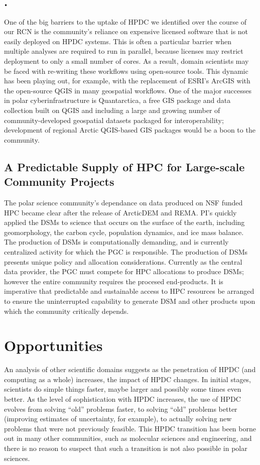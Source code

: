 \texttt{•}\documentclass[10pt,letterpaper,draft]{article}
\begin{document}
One of the big barriers to the uptake of HPDC we identified over the course of our RCN is the community's reliance on expensive licensed software that is not easily deployed on HPDC systems. This is often a particular barrier when multiple analyses are required to run in parallel, because licenses may restrict deployment to only a small number of cores. As a result, domain scientists may be faced with re-writing these workflows using open-source tools. This dynamic has been playing out, for example, with the replacement of ESRI's ArcGIS with the open-source QGIS in many geospatial workflows. One of the major successes in polar cyberinfrastructure is Quantarctica, a free GIS package and data collection built on QGIS and including a large and growing number of community-developed geospatial datasets packaged for interoperability; development of regional Arctic QGIS-based GIS packages would be a boon to the community.

\subsection*{A Predictable Supply of HPC for Large-scale Community Projects}
The polar science community's dependance on data produced on NSF funded HPC became clear after the release of ArcticDEM and REMA.  PI's quickly applied the DSMs to science that occurs on the surface of the earth, including geomorphology, the carbon cycle, population dynamics, and ice mass balance.  The production of DSMs is computationally demanding, and is currently centralized activity for which the PGC is responsible. The production of DSMs presents unique policy and allocation considerations.  Currently as the central data provider, the PGC must compete for HPC allocations to produce DSMs; however the entire community  requires the procesed end-products.  It is imperative that predictable and sustainable access to HPC resources be arranged to ensure the uninterrupted capability to generate DSM and other products upon which the community critically depends. 

\section{Opportunities}

An analysis of other scientific domains suggests as the penetration of HPDC (and computing as a whole) increases, the impact of HPDC changes. In initial stages, scientists do simple things faster, maybe larger and possibly some times even better. As the level of sophistication with HPDC increases, the use of HPDC evolves from solving ``old'' problems faster, to solving ``old'' problems better (improving estimates of uncertainty, for example), to actually solving new problems that were not previously feasible. This HPDC transition has been borne out in many other communities, such as molecular sciences and engineering, and there is no reason to suspect that such a transition is not also possible in polar sciences. 
\end{document}
